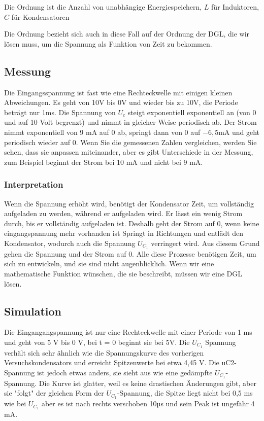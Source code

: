 %
%
Die Ordnung ist die Anzahl von unabhängige Energiespeichern,
$L$ für Induktoren, $C$ für Kondensatoren

Die Ordnung bezieht sich auch in diese Fall auf der Ordnung der DGL, die wir lösen muss, um die Spannung als Funktion von Zeit zu bekommen.

\subsection{Messung}
 Die Eingangsspannung ist fast wie eine Rechteckwelle mit einigen kleinen Abweichungen. Es geht von 10V bis 0V und wieder bis zu 10V, die Periode beträgt nur 1ms. Die Spannung von $U_c$ steigt exponentiell exponentiell an (von 0 und auf 10 Volt begrenzt) und nimmt in gleicher Weise periodisch ab. Der Strom nimmt exponentiell von 9 $\si{\milli\ampere}$ auf 0 ab, springt dann von 0 auf $-6,5 
\si{\milli\ampere} $ und geht periodisch wieder auf 0. Wenn Sie die gemessenen Zahlen vergleichen, werden Sie sehen, dass sie anpassen miteinander, aber es gibt Unterschiede in der Messung, zum Beispiel beginnt der Strom bei 10 $\si{\milli\ampere}$ und nicht bei 9 $\si{\milli\ampere}$.

\subsubsection{Interpretation}

Wenn die Spannung erhöht wird, benötigt der Kondensator Zeit, um vollständig aufgeladen zu werden, während er aufgeladen wird. Er lässt ein wenig Strom durch, bis er vollständig aufgeladen ist. Deshalb geht der Strom auf 0, wenn keine eingangspannung mehr vorhanden ist Springt in Richtungen und entlädt den Kondensator, wodurch auch die Spannung $U_{C_1}$ verringert wird. Aus diesem Grund gehen die Spannung und der Strom auf 0. Alle diese Prozesse benötigen Zeit, um sich zu entwickeln, und sie sind nicht augenblicklich. Wenn wir eine mathematische Funktion wünschen, die sie beschreibt, müssen wir eine DGL lösen.

\subsection{Simulation} Die Eingangangspannung ist nur eine Rechteckwelle mit einer Periode von 1 ms und geht von 5 V bis 0 V, bei t = 0 beginnt sie bei 5V. Die $U_{C_1}$ Spannung verhält sich sehr ähnlich wie die Spannungskurve des vorherigen Versuchskondensators und erreicht Spitzenwerte bei etwa 4,45 V. Die uC2-Spannung ist jedoch etwas anders, sie sieht aus wie eine gedämpfte $U_{C_1}$-Spannung. Die Kurve ist glatter, weil es keine drastischen Änderungen gibt, aber sie "folgt" der gleichen Form der $U_{C_1}$-Spannung, die Spitze liegt nicht bei 0,5 ms wie bei $U_{C_1}$ aber es ist nach rechts verschoben 10µs und sein Peak ist ungefähr 4$\si{\milli\ampere}$.



